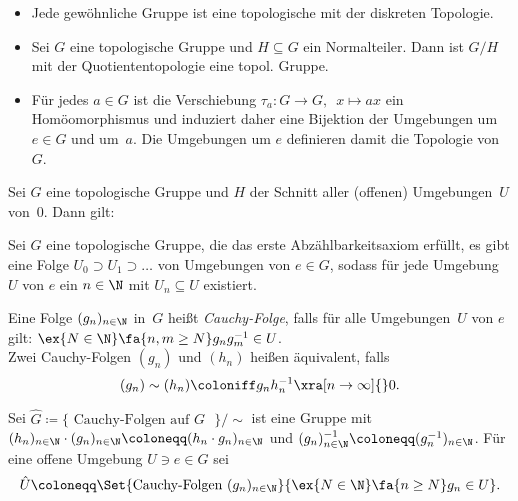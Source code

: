 \documentclass{cheat-sheet}
\newcommand{\clos}[1]{\overline{#1}} %
\begin{document}
\begin{bem}
  \begin{itemize}
    \item Jede gewöhnliche Gruppe ist eine topologische mit der diskreten Topologie.
    \item Sei $G$ eine topologische Gruppe und $H \subseteq G$ ein Normalteiler.
    Dann ist $G/H$ mit der Quotiententopologie eine topol. Gruppe.
    \item Für jedes $a \in G$ ist die Verschiebung $\tau_a : G \to G, \enspace x \mapsto ax$ ein Homöomorphismus und induziert daher eine Bijektion der Umgebungen um~$e \in G$ und um~$a$.
    Die Umgebungen um $e$ definieren damit die Topologie von~$G$.
  \end{itemize}
\end{bem}

\begin{lem}
  Sei $G$ eine topologische Gruppe und $H$ der Schnitt aller (offenen) Umgebungen~$U$ von~$0$.
  Dann gilt:
  \begin{itemize}
    \miniitem{0.4 \linewidth}{$H = \clos{\{ e \}}$}
  \end{itemize}
\end{lem}


\begin{voraussetzung}
  Sei $G$ eine topologische Gruppe, die das erste Abzählbarkeitsaxiom erfüllt, \dh{} es gibt eine Folge $U_0 \supset U_1 \supset \ldots$ von Umgebungen von $e \in G$, sodass für jede Umgebung $U$ von $e$ ein $n \in \N$ mit $U_n \subseteq U$ existiert.
\end{voraussetzung}

\begin{defn}
  Eine Folge $(g_n)_{n \in \N}$ in~$G$  heißt \emph{Cauchy-Folge}, falls für alle Umgebungen~$U$ von $e$ gilt: $\ex{N \in \N} \fa{n, m \geq N} g_n g_m^{-1} \in U$. \\
  Zwei Cauchy-Folgen $(g_n)$ und $(h_n)$ heißen äquivalent, falls
  \[
    (g_n) \sim (h_n) \coloniff g_n h_n^{-1} \xra[n \to \infty]{} 0.
  \]
\end{defn}

\begin{konstr}
  Sei $\hat{G} \coloneqq \{ \text{ Cauchy-Folgen auf $G$ } \} / {\sim}$ ist eine Gruppe mit $(h_n)_{n \in \N} \cdot (g_n)_{n \in \N} \coloneqq (h_n \cdot g_n)_{n \in \N}$ und $(g_n)_{n \in \N}^{-1} \coloneqq (g_n^{-1})_{n \in \N}$.
  Für eine offene Umgebung $U \ni e \in G$ sei
  \[
    \hat{U} \coloneqq \Set{\text{Cauchy-Folgen } (g_n)_{n \in \N}}{\ex{N \in \N} \fa{n \geq N} g_n \in U}.
  \]
\end{konstr}
\end{document}
